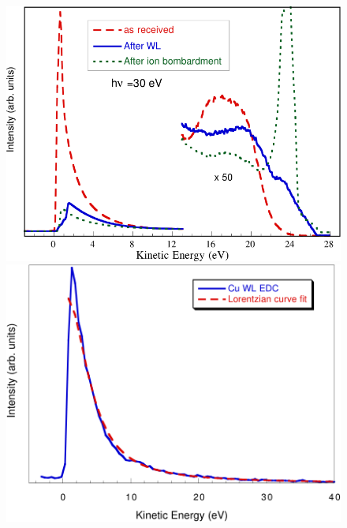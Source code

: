 \begin{figure}[tbh]
    \centering
\end{figure}
\begin{figure}[tbh]
    \centering
    \begin{minipage}[c]{0.47\textwidth}
    	\includegraphics[width=1.0\textwidth]{../ss/cimino_cu_spectrump.png}
    \end{minipage}
    \hspace{0.5cm}
    \begin{minipage}[c]{0.47\textwidth}
        \includegraphics[width=\textwidth]{../ss/cimino_cu_fit.png}
    \end{minipage}
    \begin{minipage}[c]{0.7\textwidth}

\end{minipage}
\end{figure}
